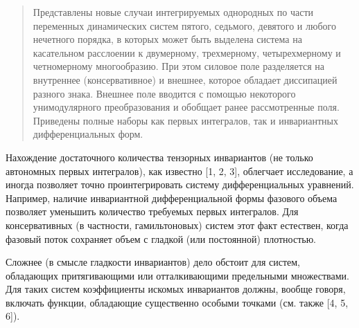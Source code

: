 
\maketitle

\begin{abstract}
Представлены новые случаи интегрируемых однородных по части переменных динамических систем
пятого, седьмого, девятого и любого нечетного порядка, в которых может быть выделена система на касательном расслоении к двумерному, трехмерному, четырехмерному и четномерному многообразию. При этом силовое поле разделяется на внутреннее (консервативное) и внешнее, которое обладает диссипацией разного знака. Внешнее поле вводится с помощью некоторого унимодулярного преобразования и обобщает ранее рассмотренные поля. Приведены полные наборы как первых интегралов, так и инвариантных дифференциальных форм.


\end{abstract}


Нахождение достаточного количества тензорных инвариантов (не только автономных первых интегралов), как известно [1, 2, 3], облегчает исследование, а иногда позволяет точно проинтегрировать систему дифференциальных уравнений. Например, наличие инвариантной дифференциальной формы фазового объема позволяет уменьшить количество требуемых первых интегралов. Для консервативных (в частности, гамильтоновых) систем этот факт естествен, когда фазовый поток сохраняет объем с гладкой (или постоянной) плотностью. 

Сложнее (в смысле гладкости инвариантов) дело обстоит для систем, обладающих притягивающими или отталкивающими предельными множествами. Для таких систем коэффициенты искомых инвариантов должны, вообще говоря, включать функции, обладающие существенно особыми точками (см. также [4, 5, 6]). 

